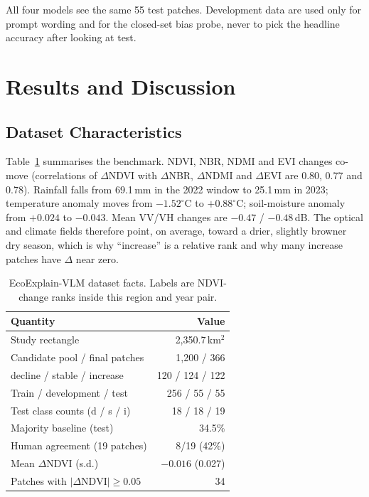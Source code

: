 \documentclass[11pt]{article}
\begin{document}
All four models see the same 55 test patches. Development data are
used only for prompt wording and for the closed-set bias probe, never
to pick the headline accuracy after looking at test.


\section{Results and Discussion}

\subsection{Dataset Characteristics}

Table~\ref{tab:data} summarises the benchmark. NDVI, NBR, NDMI and
EVI changes co-move (correlations of $\Delta$NDVI with $\Delta$NBR,
$\Delta$NDMI and $\Delta$EVI are 0.80, 0.77 and 0.78). Rainfall falls
from 69.1\,mm in the 2022 window to 25.1\,mm in 2023; temperature
anomaly moves from $-1.52^\circ\mathrm{C}$ to $+0.88^\circ\mathrm{C}$;
soil-moisture anomaly from $+0.024$ to $-0.043$. Mean VV/VH changes
are $-0.47$ / $-0.48$\,dB. The optical and climate fields therefore
point, on average, toward a drier, slightly browner dry season, which
is why ``increase'' is a relative rank and why many increase patches
have $\Delta$ near zero.

\begin{table}[t]
\centering
\small
\begin{tabular}{lr}
\toprule
Quantity & Value \\
\midrule
Study rectangle & 2,350.7\,km$^2$ \\
Candidate pool / final patches & 1,200 / 366 \\
decline / stable / increase & 120 / 124 / 122 \\
Train / development / test & 256 / 55 / 55 \\
Test class counts (d / s / i) & 18 / 18 / 19 \\
Majority baseline (test) & 34.5\% \\
Human agreement (19 patches) & 8/19 (42\%) \\
Mean $\Delta$NDVI (s.d.) & $-0.016$ (0.027) \\
Patches with $|\Delta\mathrm{NDVI}|\ge 0.05$ & 34 \\
\bottomrule
\end{tabular}
\caption{EcoExplain-VLM dataset facts. Labels are NDVI-change ranks
inside this region and year pair.}
\label{tab:data}
\end{table}
\end{document}
